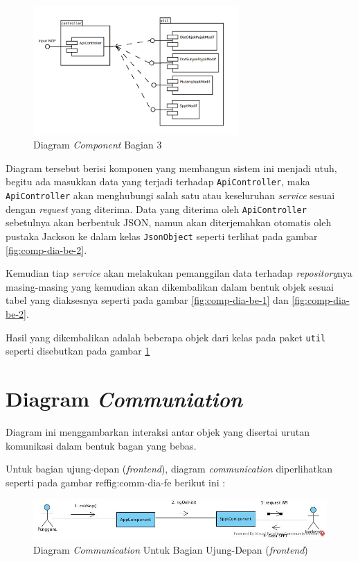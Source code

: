 \begin{figure}[H]
	\centering
	\includegraphics[width=0.7\textwidth]{./resources/uml/comp-dia-backend-3}
	\caption{Diagram \textit{Component} Bagian 3}
	\label{fig:comp-dia-be-3}
\end{figure}

Diagram tersebut berisi komponen yang membangun sistem ini menjadi utuh, begitu ada masukkan data yang terjadi terhadap \texttt{ApiController}, maka \texttt{ApiController} akan menghubungi salah satu atau keseluruhan \textit{service} sesuai dengan \textit{request} yang diterima. Data yang diterima oleh \texttt{ApiController} sebetulnya akan berbentuk JSON, namun akan diterjemahkan otomatis oleh pustaka Jackson ke dalam kelas \texttt{JsonObject} seperti terlihat pada gambar \ref{fig:comp-dia-be-2}.

Kemudian tiap \textit{service} akan melakukan pemanggilan data terhadap \textit{repository}nya masing-masing yang kemudian akan dikembalikan dalam bentuk objek sesuai tabel yang diaksesnya seperti pada gambar \ref{fig:comp-dia-be-1} dan \ref{fig:comp-dia-be-2}.

Hasil yang dikembalikan adalah beberapa objek dari kelas pada paket \texttt{util} seperti disebutkan pada gambar \ref{fig:comp-dia-be-3}

\section{Diagram \textit{Communiation}}

Diagram ini menggambarkan interaksi antar objek yang disertai urutan komunikasi dalam bentuk bagan yang bebas.

Untuk bagian ujung-depan (\textit{frontend}), diagram \textit{communication} diperlihatkan seperti pada gambar ref{fig:comm-dia-fe} berikut ini :

\begin{figure}[H]
	\centering
	\includegraphics[width=1\textwidth]{./resources/uml/comm-dia-fe}
	\caption{Diagram \textit{Communication} Untuk Bagian Ujung-Depan (\textit{frontend})}
	\label{fig:comm-dia-fe}	
\end{figure}

